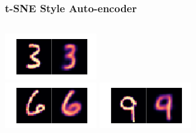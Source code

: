 \documentclass[10pt, usenames, dvipsnames, table]{beamer}
\begin{document}
\begin{frame}
  \frametitle{t-SNE Style Auto-encoder}
  \begin{columns}
    \includegraphics[width=\linewidth]
    {models/mnist_student_e300_L2_b64/reconstruction_0} \\
    \vspace{2em}
    \includegraphics[width=\linewidth]
    {models/mnist_student_e300_L2_b64/reconstruction_2}
    \includegraphics[width=\linewidth]
    {models/mnist_student_e300_L2_b64/reconstruction_3} \\
    \vspace{2em}

\end{columns}
\end{frame}
\end{document}

